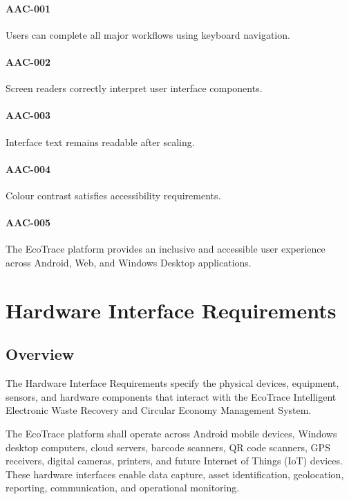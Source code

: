 \paragraph{AAC-001}

Users can complete all major workflows using keyboard navigation.

\paragraph{AAC-002}

Screen readers correctly interpret user interface components.

\paragraph{AAC-003}

Interface text remains readable after scaling.

\paragraph{AAC-004}

Colour contrast satisfies accessibility requirements.

\paragraph{AAC-005}

The EcoTrace platform provides an inclusive and accessible user
experience across Android, Web, and Windows Desktop applications.

\section{Hardware Interface Requirements}

\subsection{Overview}

The Hardware Interface Requirements specify the physical devices,
equipment, sensors, and hardware components that interact with the
EcoTrace Intelligent Electronic Waste Recovery and Circular Economy
Management System.

The EcoTrace platform shall operate across Android mobile devices,
Windows desktop computers, cloud servers, barcode scanners, QR code
scanners, GPS receivers, digital cameras, printers, and future Internet
of Things (IoT) devices. These hardware interfaces enable data capture,
asset identification, geolocation, reporting, communication, and
operational monitoring.

